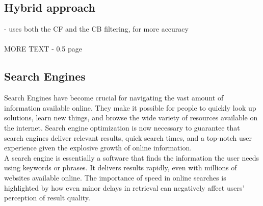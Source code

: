 \documentclass[10pt,oneside,english,a4paper]{article}
\begin{document}
\subsection{Hybrid approach}
- uses both the CF and the CB filtering, for more accuracy\\\\
%
MORE TEXT - 0.5 page\\






\clearpage

\subsection{Search Engines}
Search Engines have become crucial for navigating the vast amount of information available online. They make it possible for people to quickly look up solutions, learn new things, and browse the wide variety of resources available on the internet. Search engine optimization is now necessary to guarantee that search engines deliver relevant results, quick search times, and a top-notch user experience given the explosive growth of online information.\\
A search engine is essentially a software that finds the information the user needs using keywords or phrases. It delivers results rapidly, even with millions of websites available online.
The importance of speed in online searches is highlighted by how even minor delays in retrieval can negatively affect users' perception of result quality.
\cite{pub.1171882357}







\clearpage
\end{document}
